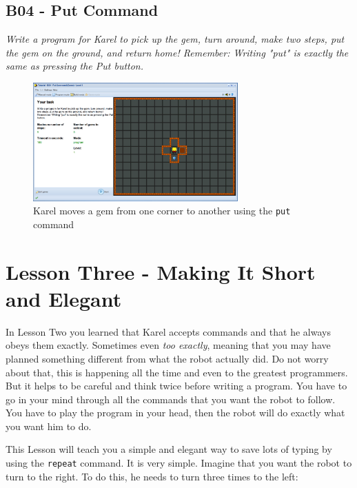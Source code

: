 \documentclass[article,A4,12pt]{llncs}
\begin{document}
\subsection{B04 - Put Command}

{\em Write a program for Karel to pick up the gem, turn around, make 
two steps, put the gem on the ground, and return home! Remember: 
Writing "put" is exactly the same as pressing the Put button.}

\begin{figure}[!ht]
\begin{center}
\includegraphics[width=0.7\textwidth]{img/b04.png}
\end{center}
\vspace{-4mm}
\caption{Karel moves a gem from one corner to another using the {\tt put} command}
\label{fig:b04}
\vspace{-4mm}
\end{figure}
\noindent


\section{Lesson Three - Making It Short and Elegant}

In Lesson Two you learned that Karel accepts commands and that he always obeys 
them exactly. Sometimes even {\em too exactly}, meaning that you may have planned
something different from what the robot actually did. Do not worry about that, this
is happening all the time and even to the greatest programmers. But it helps to be careful and 
think twice before writing a program. You have to go in your mind through 
all the commands that you want the robot to follow. You have to play the program 
in your head, then the robot will do exactly what you want him to do. 

This Lesson will teach you a simple and elegant way to save lots of typing 
by using the {\tt repeat} command. It is very simple. Imagine that you want the
robot to turn to the right. To do this, he needs to turn three times to the left:
\end{document}
